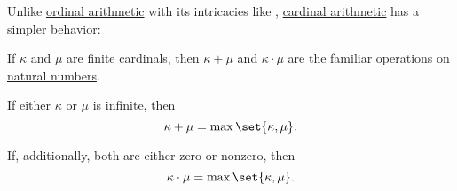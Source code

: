 \begin{proposition}\label{thm:simplified_cardinal_arithmetic}
  Unlike \hyperref[def:ordinal_arithmetic]{ordinal arithmetic} with its intricacies like , \hyperref[def:cardinal_arithmetic]{cardinal arithmetic} has a simpler behavior:
  \begin{thmenum}
     If \( \kappa \) and \( \mu \) are finite cardinals, then \( \kappa + \mu \) and \( \kappa \cdot \mu \) are the familiar operations on \hyperref[def:set_of_natural_numbers]{natural numbers}.

     If either \( \kappa \) or \( \mu \) is infinite, then
    \begin{equation*}
      \kappa + \mu = \max\set{ \kappa, \mu }.
    \end{equation*}

    If, additionally, both are either zero or nonzero, then
    \begin{equation*}
      \kappa \cdot \mu = \max\set{ \kappa, \mu }.
    \end{equation*}
  \end{thmenum}
\end{proposition}
